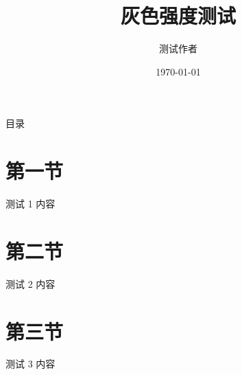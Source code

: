 \documentclass[aspectratio=169, hyperref, UTF8, CJK]{beamer}
\title{灰色强度测试}
\author{测试作者}
\institute{北京理工大学}
\date{\today}
\begin{document}
\begin{frame}{目录}
  \tableofcontents
\end{frame}

\section{第一节}
\begin{frame}{测试 1}
  内容
\end{frame}

\section{第二节}
\begin{frame}{测试 2}
  内容
\end{frame}

\section{第三节}
\begin{frame}{测试 3}
  内容
\end{frame}
\end{document}
